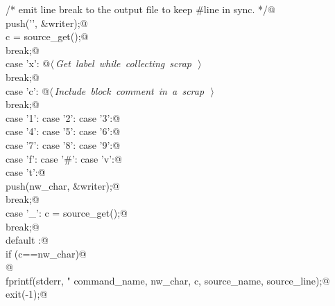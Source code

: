 \documentclass[a4paper]{report}
\begin{document}
\begin{flushleft}
\begin{minipage}{\linewidth}
\begin{list}{}{}
\mbox{}\verb@              /* emit line break to the output file to keep #line in sync. */@\\
\mbox{}\verb@              push('\n', &writer);@\\
\mbox{}\verb@              c = source_get();@\\
\mbox{}\verb@              break;@\\
\mbox{}\verb@    case 'x': @\hbox{$\langle\,${\it Get label while collecting scrap}\nobreak\ {\footnotesize {}}$\,\rangle$}\verb@@\\
\mbox{}\verb@              break;@\\
\mbox{}\verb@    case 'c': @\hbox{$\langle\,${\it Include block comment in a scrap}\nobreak\ {\footnotesize {}}$\,\rangle$}\verb@@\\
\mbox{}\verb@              break;@\\
\mbox{}\verb@    case '1': case '2': case '3':@\\
\mbox{}\verb@    case '4': case '5': case '6':@\\
\mbox{}\verb@    case '7': case '8': case '9':@\\
\mbox{}\verb@    case 'f': case '#': case 'v':@\\
\mbox{}\verb@    case 't':@\\
\mbox{}\verb@              push(nw_char, &writer);@\\
\mbox{}\verb@              break;@\\
\mbox{}\verb@    case '_': c = source_get();@\\
\mbox{}\verb@              break;@\\
\mbox{}\verb@    default :@\\
\mbox{}\verb@          if (c==nw_char)@\\
\mbox{}@\\
\mbox{}\verb@          fprintf(stderr, "%s: unexpected %c%c in scrap (%s, %d)\n",@\\
\mbox{}\verb@                      command_name, nw_char, c, source_name, source_line);@\\
\mbox{}\verb@              exit(-1);@\\

\end{list}
\end{minipage}
\end{flushleft}
\end{document}
